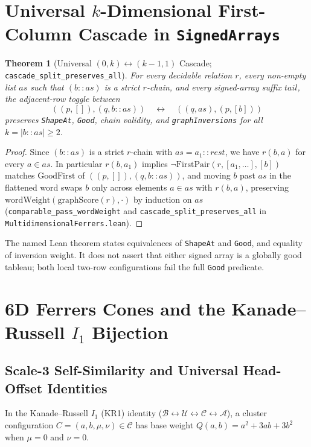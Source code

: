 \documentclass[11pt]{article}
\newtheorem{theorem}{Theorem}[section]
\theoremstyle{definition}
\begin{document}
\section{Universal $k$-Dimensional First-Column Cascade in \texttt{SignedArrays}}

\begin{theorem}[Universal $(0, k) \leftrightarrow (k-1, 1)$ Cascade; \nolinkurl{cascade_split_preserves_all}]
\label{thm:cascade}
For every decidable relation $r$, every non-empty list $\mathit{as}$ such that $(b :: \mathit{as})$ is a strict $r$-chain, and every signed-array suffix $\mathit{tail}$, the adjacent-row toggle between
\[
  ((p, []), (q, b :: \mathit{as})) \quad\longleftrightarrow\quad ((q, \mathit{as}), (p, [b]))
\]
preserves \texttt{ShapeAt}, \texttt{Good}, chain validity, and \texttt{graphInversions} for all $k = |b :: \mathit{as}| \ge 2$.
\end{theorem}
\begin{proof}
Since $(b :: \mathit{as})$ is a strict $r$-chain with $\mathit{as} = a_1 :: \mathit{rest}$, we have $r(b, a)$ for every $a \in \mathit{as}$. In particular $r(b, a_1)$ implies $\neg \mathrm{FirstPair}(r, [a_1, \dots], [b])$ matches $\mathrm{GoodFirst}$ of $((p, []), (q, b :: \mathit{as}))$, and moving $b$ past $\mathit{as}$ in the flattened word swaps $b$ only across elements $a \in \mathit{as}$ with $r(b, a)$, preserving $\mathrm{wordWeight}(\mathrm{graphScore}(r), \cdot)$ by induction on $\mathit{as}$ (\nolinkurl{comparable_pass_wordWeight} and \nolinkurl{cascade_split_preserves_all} in \nolinkurl{MultidimensionalFerrers.lean}).
\end{proof}
The named Lean theorem states equivalences of \texttt{ShapeAt} and \texttt{Good}, and equality of inversion weight. It does not assert that either signed array is a globally good tableau; both local two-row configurations fail the full \texttt{Good} predicate.\par

\section{6D Ferrers Cones and the Kanade--Russell $I_1$ Bijection}

\subsection{Scale-3 Self-Similarity and Universal Head-Offset Identities}

In the Kanade--Russell $I_1$ (KR1) identity ($\mathcal{B} \leftrightarrow \mathcal{U} \leftrightarrow \mathcal{C} \leftrightarrow \mathcal{A}$), a cluster configuration $C = (a, b, \mu, \nu) \in \mathcal{C}$ has base weight $Q(a, b) = a^2 + 3ab + 3b^2$ when $\mu = 0$ and $\nu = 0$.
\end{document}
